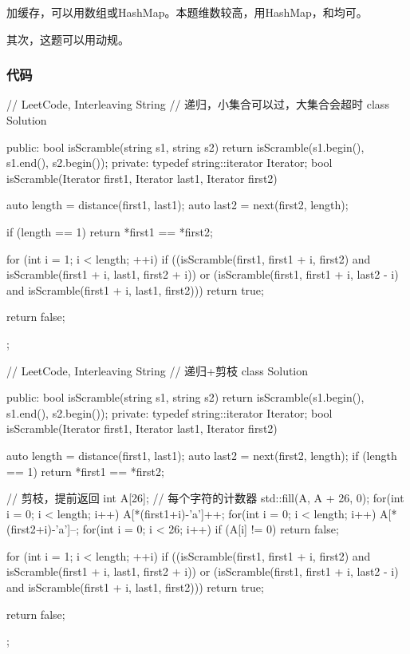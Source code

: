 加缓存，可以用数组或HashMap。本题维数较高，用HashMap，和均可。

其次，这题可以用动规。

\subsubsection{代码}

\begin{Code}
// LeetCode, Interleaving String
// 递归，小集合可以过，大集合会超时
class Solution {
public:
    bool isScramble(string s1, string s2) {
        return isScramble(s1.begin(), s1.end(), s2.begin());
    }
private:
    typedef string::iterator Iterator;
    bool isScramble(Iterator first1, Iterator last1, Iterator first2) {
        auto length = distance(first1, last1);
        auto last2 = next(first2, length);

        if (length == 1) return *first1 == *first2;

        for (int i = 1; i < length; ++i)
            if ((isScramble(first1, first1 + i, first2)
                 and isScramble(first1 + i, last1, first2 + i))
                    or (isScramble(first1, first1 + i, last2 - i)
                            and isScramble(first1 + i, last1, first2)))
                return true;

        return false;
    }
};
\end{Code}

\begin{Code}
// LeetCode, Interleaving String
// 递归+剪枝
class Solution {
public:
    bool isScramble(string s1, string s2) {
        return isScramble(s1.begin(), s1.end(), s2.begin());
    }
private:
    typedef string::iterator Iterator;
    bool isScramble(Iterator first1, Iterator last1, Iterator first2) {
        auto length = distance(first1, last1);
        auto last2 = next(first2, length);
        if (length == 1) return *first1 == *first2;

        // 剪枝，提前返回
        int A[26]; // 每个字符的计数器
        std::fill(A, A + 26, 0);
        for(int i = 0; i < length; i++) A[*(first1+i)-'a']++;
        for(int i = 0; i < length; i++) A[*(first2+i)-'a']--;
        for(int i = 0; i < 26; i++) if (A[i] != 0) return false;

        for (int i = 1; i < length; ++i)
            if ((isScramble(first1, first1 + i, first2)
                 and isScramble(first1 + i, last1, first2 + i))
                    or (isScramble(first1, first1 + i, last2 - i)
                            and isScramble(first1 + i, last1, first2)))
                return true;

        return false;
    }
};
\end{Code}

